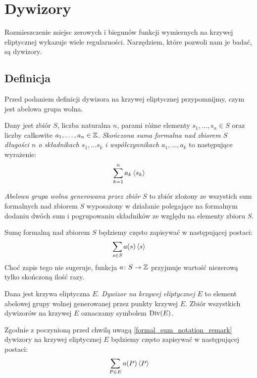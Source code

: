 \section{Dywizory}

Rozmieszczenie miejsc zerowych i biegunów
funkcji wymiernych na krzywej eliptycznej
wykazuje wiele regularności.
Narzędziem, które pozwoli nam je badać, są dywizory.

\subsection*{Definicja}

Przed podaniem definicji dywizora na krzywej eliptycznej przypomnijmy,
czym jest abelowa grupa wolna.

\begin{definition}
Dany jest zbiór $S$,
liczba naturalna $n$,
parami różne elementy $s_1, \ldots, s_n \in S$
oraz liczby całkowite $a_1, \ldots, a_n \in \mathbb{Z}$.
\emph{Skończona suma formalna nad zbiorem $S$ długości $n$
o składnikach $s_1, \ldots s_k$ i współczynnikach $a_1, \ldots, a_k$}
to następujące wyrażenie:
\begin{equation*}
\sum_{k=1}^n a_k\left\langle s_k\right\rangle
\end{equation*}

\emph{Abelowa grupa wolna generowana przez zbiór $S$}
to zbiór złożony ze wszystich sum formalnych nad zbiorem $S$
wyposażony w działanie polegające na formalnym dodaniu dwóch sum
i pogrupowaniu składników ze względu na elementy zbioru $S$.
\end{definition}

\begin{remark}\label{formal_sum_notation_remark}
Sumę formalną nad zbiorem $S$ będziemy często zapisywać
w następującej postaci:
\begin{equation*}
\sum_{s \in S}a(s)\left\langle s\right\rangle
\end{equation*}
Choć zapis tego nie sugeruje,
funkcja $a \colon S \to \mathbb{Z}$ przyjmuje wartość niezerową
tylko skończoną ilość razy.
\end{remark}

\begin{definition}
Dana jest krzywa eliptyczna $E$.
\emph{Dywizor na krzywej eliptycznej $E$}
to element abelowej grupy wolnej generowanej przez punkty krzywej $E$.
Zbiór wszystkich dywizorów na krzywej $E$ oznaczamy symbolem $\operatorname{Div}(E)$.
\end{definition}

\begin{remark}
Zgodnie z poczynioną przed chwilą uwagą \ref{formal_sum_notation_remark}
dywizory na krzywej eliptycznej $E$ będziemy często zapisywać
w następującej postaci:
\begin{equation*}
\sum_{P \in E} a(P)\left\langle P\right\rangle
\end{equation*}
\end{remark}

